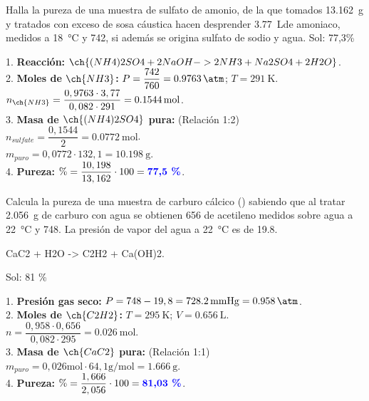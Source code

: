 \begin{exercise}
    Halla la pureza de una muestra de sulfato de amonio, de la que tomados \qty{13.162}{\g} y tratados con exceso de sosa cáustica hacen desprender \qty{3.77}{\L}de amoniaco, medidos a \qty{18}{\celsius} y \qty{742}{\mmhg}, si además se origina sulfato de sodio y agua. Sol: 77,3\%

    \begin{solu}
        1. \textbf{Reacción:} \( \ch{(NH4)2SO4 + 2 NaOH -> 2 NH3 + Na2SO4 + 2 H2O} \). \\
        2. \textbf{Moles de \( \ch{NH3} \):} \( P = \dfrac{742}{760} = \qty{0,9763}{\atm} \); \( T = \qty{291}{\K} \). \\
        \( n_{\ch{NH3}} = \dfrac{0,9763 \cdot 3,77}{0,082 \cdot 291} = \qty{0,1544}{\mol} \). \\
        3. \textbf{Masa de \( \ch{(NH4)2SO4} \) pura:} (Relación 1:2) \\
        \( n_{sulfate} = \dfrac{0,1544}{2} = \qty{0,0772}{\mol} \). \\
        \( m_{puro} = 0,0772 \cdot 132,1 = \qty{10,198}{\g} \). \\
        4. \textbf{Pureza:} \( \% = \dfrac{10,198}{13,162} \cdot 100 = \textbf{\textcolor{blue}{77,5 \%}} \).
    \end{solu}

\end{exercise}

\begin{exercise}
    Calcula la pureza de una muestra de carburo cálcico () sabiendo que al tratar \qty{2.056}{\g} de carburo con agua se obtienen \qty{656}{\cc} de acetileno medidos sobre agua a \qty{22}{\celsius} y \qty{748}{\mmhg}. La presión de vapor del agua a \qty{22}{\celsius} es de \qty{19.8}{\mmhg}.
    \begin{reaction*}
        CaC2 + H2O -> C2H2 + Ca(OH)2.
    \end{reaction*}
    Sol: 81 \%
    \begin{solu}
        1. \textbf{Presión gas seco:} \( P = 748 - 19,8 = \qty{728,2}{\mmHg} = \qty{0,958}{\atm} \). \\
        2. \textbf{Moles de \( \ch{C2H2} \):} \( T = \qty{295}{\K} \); \( V = \qty{0,656}{\L} \). \\
        \( n = \dfrac{0,958 \cdot 0,656}{0,082 \cdot 295} = \qty{0,026}{\mol} \). \\
        3. \textbf{Masa de \( \ch{CaC2} \) pura:} (Relación 1:1) \\
        \( m_{puro} = 0,026 \si{\mol} \cdot 64,1 \si{\g\per\mol} = \qty{1,666}{\g} \). \\
        4. \textbf{Pureza:} \( \% = \dfrac{1,666}{2,056} \cdot 100 = \textbf{\textcolor{blue}{81,03 \%}} \).
    \end{solu}

\end{exercise}

